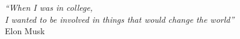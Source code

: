 \cleardoublepage
{}
\thispagestyle{empty}

\vspace*{3cm}
\begin{flushright}
\textit{
	\enquote{When I was in college,\\
		I wanted to be involved in things that would change the world}}
\\ Elon Musk


\end{flushright}